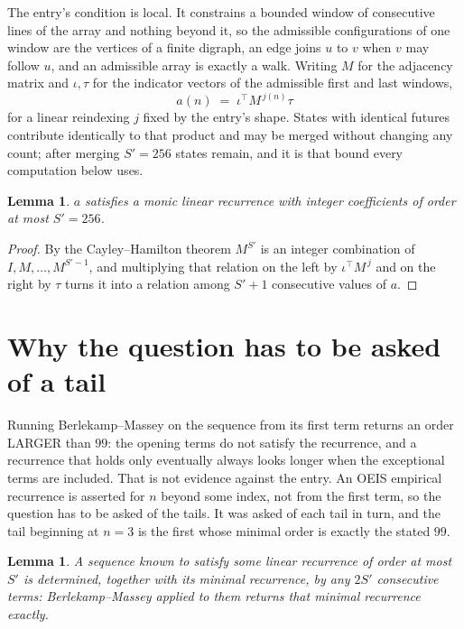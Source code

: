 \documentclass[11pt,a4paper]{article}
\theoremstyle{plain}
\newtheorem{lemma}[theorem]{Lemma}
\theoremstyle{definition}
\begin{document}
The entry's condition is local. It constrains a bounded window of consecutive lines of the
array and nothing beyond it, so the admissible configurations of one window are the vertices of
a finite digraph, an edge joins $u$ to $v$ when $v$ may follow $u$, and an admissible array is
exactly a walk. Writing $M$ for the adjacency matrix and $\iota,\tau$ for the indicator vectors
of the admissible first and last windows,
\[
a(n)\;=\;\iota^{\!\top}M^{\,j(n)}\tau
\]
for a linear reindexing $j$ fixed by the entry's shape. States with identical futures
contribute identically to that product and may be merged without changing any count; after
merging $S'=256$ states remain, and it is that bound every computation below uses.

\begin{lemma}\label{lem:cf}
$a$ satisfies a monic linear recurrence with integer coefficients of order at most $S'=256$.
\end{lemma}

\begin{proof}
By the Cayley--Hamilton theorem $M^{S'}$ is an integer combination of $I,M,\dots,M^{S'-1}$,
and multiplying that relation on the left by $\iota^{\!\top}M^{\,j}$ and on the right by
$\tau$ turns it into a relation among $S'+1$ consecutive values of $a$.
\end{proof}

\section{Why the question has to be asked of a tail}

Running Berlekamp--Massey on the sequence from its first term returns an order LARGER than $99$: the opening terms do not satisfy the recurrence, and a recurrence that holds only eventually always looks longer when the exceptional terms are included. That is not evidence against the entry. An OEIS empirical recurrence is asserted for $n$ beyond some index, not from the first term, so the question has to be asked of the tails. It was asked of each tail in turn, and the tail beginning at $n=3$ is the first whose minimal order is exactly the stated $99$.

\begin{lemma}\label{lem:bm}
A sequence known to satisfy some linear recurrence of order at most $S'$ is determined,
together with its minimal recurrence, by any $2S'$ consecutive terms: Berlekamp--Massey applied
to them returns that minimal recurrence exactly.
\end{lemma}
\end{document}
